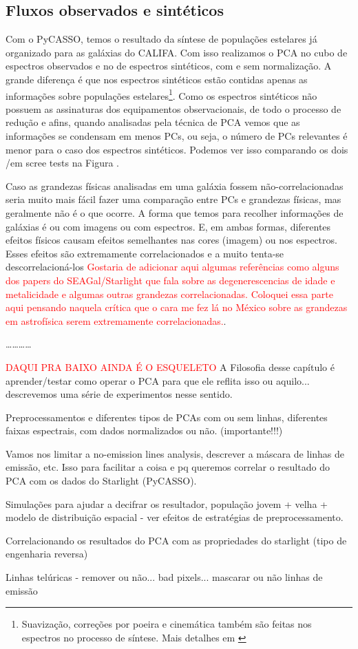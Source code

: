 \subsection{Fluxos observados e sintéticos}
\label{sec:UsoPCA:EngRev:ObsvsSyn}

Com o PyCASSO, temos o resultado da síntese de populações estelares já organizado para as galáxias do CALIFA. Com isso
realizamos o PCA no cubo de espectros observados e no de espectros sintéticos, com e sem normalização. A grande
diferença é que nos espectros sintéticos estão contidas apenas as informações sobre populações
estelares\footnote{Suavização, correções por poeira e cinemática também são feitas nos espectros no processo de síntese.
Mais detalhes em \citet{CidFernandes2005}}. Como os espectros sintéticos não possuem as assinaturas dos equipamentos
observacionais, de todo o processo de redução e afins, quando analisadas pela técnica de PCA vemos que as informações se
condensam em menos PCs, ou seja, o número de PCs relevantes é menor para o caso dos espectros sintéticos. Podemos ver
isso comparando os dois {/em scree tests} na Figura \fixme. 

Caso as grandezas físicas analisadas em uma galáxia fossem
não-correlacionadas seria muito mais fácil fazer uma comparação entre PCs e grandezas físicas, mas geralmente não é o
que ocorre. A forma que temos para recolher informações de galáxias é ou com imagens ou com espectros. E, em ambas
formas, diferentes efeitos físicos causam efeitos semelhantes nas cores (imagem) ou nos espectros. Esses efeitos são
extremamente correlacionados e a muito tenta-se descorrelacioná-los \ojo \citneed \textcolor{red}{Gostaria de adicionar
aqui algumas referências como alguns dos papers do SEAGal/Starlight que fala sobre as degenerescencias de idade e
metalicidade e algumas outras grandezas correlacionadas. Coloquei essa parte aqui pensando naquela crítica que o cara me
fez lá no México sobre as grandezas em astrofísica serem extremamente correlacionadas.}.

\ldots \dots \ldots \ldots

\textcolor{red}{DAQUI PRA BAIXO AINDA É O ESQUELETO}
\ojo A Filosofia desse capítulo é aprender/testar como operar o PCA para que ele
reflita isso ou aquilo... descrevemos uma série de experimentos nesse sentido.

Preprocessamentos e diferentes tipos de PCAs com ou sem linhas, diferentes
faixas espectrais, com dados normalizados ou não. (importante!!!)

Vamos nos limitar a no-emission lines analysis, descrever a máscara de linhas de
emissão, etc. Isso para facilitar a coisa e pq queremos correlar o resultado do
PCA com os dados do Starlight (PyCASSO).

Simulações para ajudar a decifrar os resultador, população jovem + velha +
modelo de distribuição espacial - ver efeitos de estratégias de
preprocessamento.

Correlacionando os resultados do PCA com as propriedades do starlight (tipo de
engenharia reversa)

Linhas telúricas - remover ou não... bad pixels... mascarar ou não linhas de
emissão